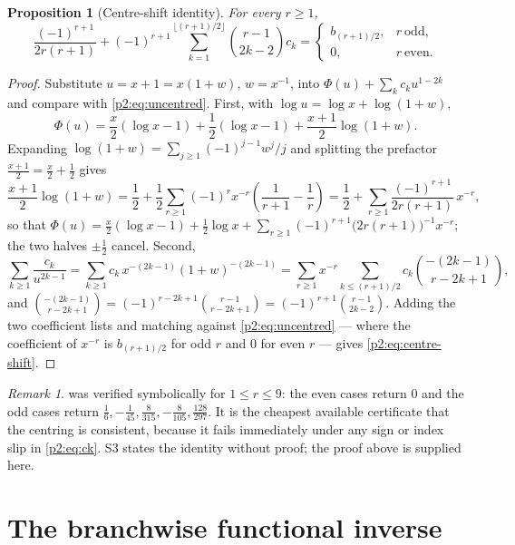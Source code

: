 \documentclass[11pt,a4paper,oneside]{book}
\theoremstyle{plain}
\newtheorem{proposition}[theorem]{Proposition}
\theoremstyle{definition}
\theoremstyle{remark}
\newtheorem{remark}[theorem]{Remark}
\begin{document}
\begin{proposition}[Centre-shift identity]
\label{p2:prop:centre-shift}
For every \(r\ge1\),
\begin{equation}
 \frac{(-1)^{r+1}}{2r(r+1)}
 +(-1)^{r+1}\!\!\sum_{k=1}^{\lfloor(r+1)/2\rfloor}\!\!
 \binom{r-1}{2k-2}c_k
 =\begin{cases}b_{(r+1)/2},& r\ \text{odd},\\[0.2em] 0,& r\ \text{even}.\end{cases}
 \label{p2:eq:centre-shift}
\end{equation}
\end{proposition}

\begin{proof}
Substitute \(u=x+1=x(1+w)\), \(w=x^{-1}\), into
\(\Phi(u)+\sum_kc_ku^{1-2k}\) and compare with \cref{p2:eq:uncentred}.
First, with \(\log u=\log x+\log(1+w)\),
\[
 \Phi(u)=\frac x2(\log x-1)+\frac12(\log x-1)
 +\frac{x+1}2\log(1+w).
\]
Expanding \(\log(1+w)=\sum_{j\ge1}(-1)^{j-1}w^j/j\) and splitting the prefactor
\(\tfrac{x+1}2=\tfrac x2+\tfrac12\) gives
\[
 \frac{x+1}2\log(1+w)
 =\frac12+\frac12\sum_{r\ge1}(-1)^rx^{-r}
   \left(\frac1{r+1}-\frac1r\right)
 =\frac12+\sum_{r\ge1}\frac{(-1)^{r+1}}{2r(r+1)}\,x^{-r},
\]
so that \(\Phi(u)=\tfrac x2(\log x-1)+\tfrac12\log x
+\sum_{r\ge1}(-1)^{r+1}\bigl(2r(r+1)\bigr)^{-1}x^{-r}\); the two halves
\(\pm\tfrac12\) cancel.  Second,
\[
 \sum_{k\ge1}\frac{c_k}{u^{2k-1}}
 =\sum_{k\ge1}c_k\,x^{-(2k-1)}(1+w)^{-(2k-1)}
 =\sum_{r\ge1}x^{-r}\sum_{k\le(r+1)/2}c_k
   \binom{-(2k-1)}{r-2k+1},
\]
and \(\binom{-(2k-1)}{r-2k+1}=(-1)^{r-2k+1}\binom{r-1}{r-2k+1}
=(-1)^{r+1}\binom{r-1}{2k-2}\).  Adding the two coefficient lists and matching
against \cref{p2:eq:uncentred} --- where the coefficient of \(x^{-r}\) is
\(b_{(r+1)/2}\) for odd \(r\) and \(0\) for even \(r\) --- gives
\cref{p2:eq:centre-shift}.
\end{proof}

\begin{remark}
 was verified symbolically for \(1\le r\le9\): the
even cases return \(0\) and the odd cases return
\(\tfrac16,-\tfrac1{45},\tfrac8{315},-\tfrac8{105},\tfrac{128}{297}\).  It is
the cheapest available certificate that the centring is consistent, because it
fails immediately under any sign or index slip in \cref{p2:eq:ck}.  \textsf{S3}
states the identity without proof; the proof above is supplied here.
\end{remark}

\section{The branchwise functional inverse}
\label{p2:sec:branch-inverse}
\end{document}
